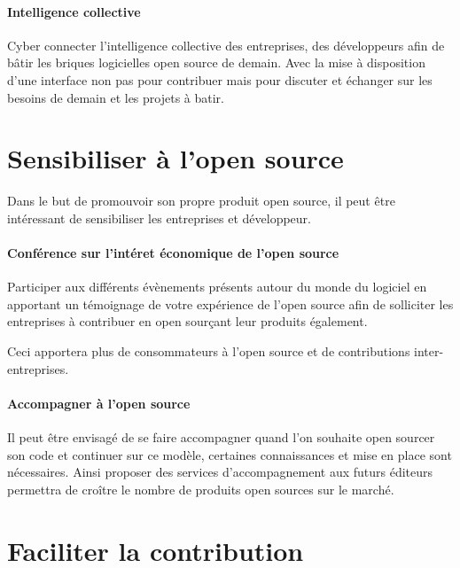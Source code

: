 	\paragraph{Intelligence collective\\}

	Cyber connecter l'intelligence collective des entreprises, des développeurs afin de bâtir les briques logicielles open source de demain. Avec la mise à disposition d'une interface non pas pour contribuer mais pour discuter et échanger sur les besoins de demain et les projets à batir.

\section{Sensibiliser à l'open source}

	Dans le but de promouvoir son propre produit open source, il peut être intéressant de sensibiliser les entreprises et développeur.

	\paragraph{Conférence sur l'intéret économique de l'open source\\}

	Participer aux différents évènements présents autour du monde du logiciel en apportant un témoignage de votre expérience de l'open source afin de solliciter les entreprises à contribuer en open sourçant leur produits également.

	Ceci apportera plus de consommateurs à l'open source et de contributions inter-entreprises.

	\paragraph{Accompagner à l'open source\\}

	Il peut être envisagé de se faire accompagner quand l'on souhaite open sourcer son code et continuer sur ce modèle, certaines connaissances et mise en place sont nécessaires. Ainsi proposer des services d'accompagnement aux futurs éditeurs permettra de croître le nombre de produits open sources sur le marché.

\section{Faciliter la contribution}
	
